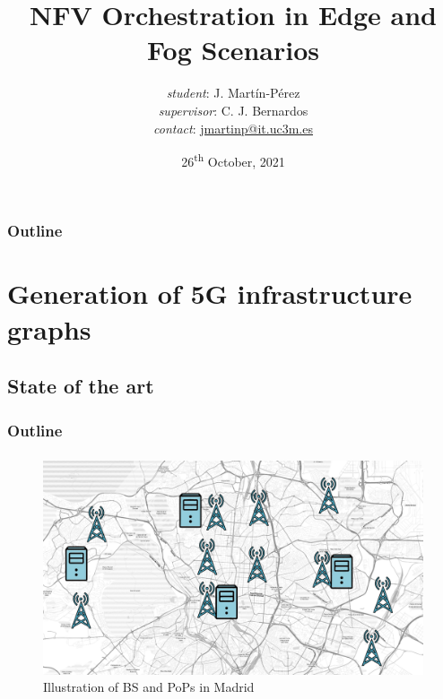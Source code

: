 \documentclass[aspectratio=169]{beamer}
\title{NFV Orchestration in Edge and Fog Scenarios}
\date{26\textsuperscript{th} October, 2021}
\author{
    {\footnotesize \textit{student}}: \! \! \! J. Martín-Pérez\\
    {\footnotesize \textit{supervisor}}: C. J. Bernardos\\
    \vspace{2em}
    \footnotesize{\textit{contact}: \href{mailto:jmartinp@it.uc3m.es}{jmartinp@it.uc3m.es}}
}
\begin{document}
\begin{frame}
\titlepage
\end{frame}

\setcounter{framenumber}{0}


\begin{frame}
    \frametitle{Outline}
\end{frame}



\section{Generation of 5G infrastructure graphs}
\subsection{State of the art}
\begin{frame}
    \frametitle{Outline}
    \tableofcontents[subsectionstyle=show/shaded/hide,sectionstyle=show/shaded]
\end{frame}


\begin{frame}
    \frametitle{\secname}
    \framesubtitle{\subsecname}

    \begin{figure}
        \centering
        \includegraphics[width=.8\textwidth]{img/pop-and-antennas-no-labels.pdf}
        \caption{Illustration of BS and PoPs in Madrid }
        \label{fig:bs-pops-no-label}
    \end{figure}
\end{frame}
\end{document}
